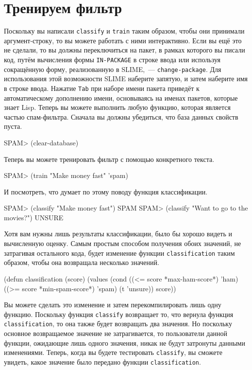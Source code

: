 \section{Тренируем фильтр}

Поскольку вы написали \lstinline{classify} и \lstinline{train} таким образом, чтобы они принимали
аргумент-строку, то вы можете работать с ними интерактивно.  Если вы ещё это не сделали,
то вы должны переключиться на пакет, в рамках которого вы писали код, путём вычисления
формы \lstinline{IN-PACKAGE} в строке ввода или используя сокращённую форму, реализованную в
SLIME,~--- \lstinline{change-package}.  Для использования этой возможности SLIME наберите
запятую, и затем наберите имя в строке ввода.  Нажатие \lstinline{Tab} при наборе имени пакета
приведёт к автоматическому дополнению имени, основываясь на именах пакетов, которые знает
Lisp.  Теперь вы можете выполнить любую функцию, которая является частью спам-фильтра.
Сначала вы должны убедиться, что база данных свойств пуста.

\begin{myverb}
SPAM> (clear-database)
\end{myverb}

Теперь вы можете тренировать фильтр с помощью конкретного текста.

\begin{myverb}
SPAM> (train "Make money fast" 'spam)
\end{myverb}

И посмотреть, что думает по этому поводу функция классификации.

\begin{myverb}
SPAM> (classify "Make money fast")
SPAM
SPAM> (classify "Want to go to the movies?")
UNSURE
\end{myverb}

Хотя вам нужны лишь результаты классификации, было бы хорошо видеть и вычисленную оценку.
Самым простым способом получения обоих значений, не затрагивая остального кода, будет
изменение функции \lstinline{classification} таким образом, чтобы она возвращала несколько
значений.

\begin{myverb}
(defun classification (score)
  (values
   (cond
     ((<= score *max-ham-score*) 'ham)
     ((>= score *min-spam-score*) 'spam)
     (t 'unsure))
   score))
\end{myverb}

Вы можете сделать это изменение и затем перекомпилировать лишь одну функцию.  Поскольку
функция \lstinline{classify} возвращает то, что вернула функция \lstinline{classification}, то она
также будет возвращать два значения.  Но поскольку основное возвращаемое значение не
затрагивается, то пользователи данной функции, ожидающие лишь одного значения, никак не
будут затронуты данными изменениями.  Теперь, когда вы будете тестировать \lstinline{classify},
вы сможете увидеть, какое значение было передано функции \lstinline{classification}.

